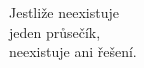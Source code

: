 \documentclass[preview]{standalone}
\begin{document}
\begin{center}
Jestliže neexistuje\\ jeden průsečík,\\ neexistuje ani řešení.
\end{center}
\end{document}
